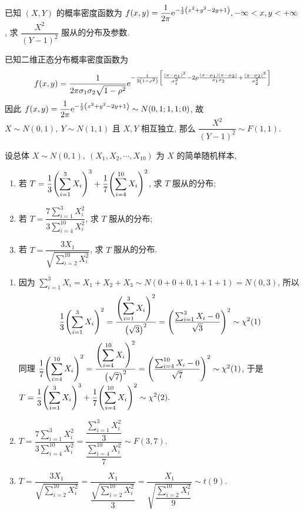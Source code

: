 \begin{example}
    已知 $(X,Y)$ 的概率密度函数为 $\displaystyle f(x,y)=\dfrac{1}{2\pi}\mathrm{e}^{-\frac{1}{2}\qty(x^2+y^2-2y+1)},-\infty<x,y<+\infty$, 求 $\dfrac{X^2}{(Y-1)^2}$ 服从的分布及参数.
\end{example}
\begin{solution}
    已知二维正态分布概率密度函数为 $$f(x,y)=\dfrac{1}{2\pi\sigma_1\sigma_2\sqrt{1-\rho^2}}\mathrm{e}^{-\frac{1}{2\qty(1-\rho^2)}\qty[\frac{(x-\mu_1)^2}{\sigma_1^2}-2\rho\frac{(x-\mu_1)(x-\mu_2)}{\sigma_1\sigma_2}+\frac{(y-\mu_2)^2}{\sigma_2^2}]}$$
    因此 $f(x,y)=\dfrac{1}{2\pi}\mathrm{e}^{-\frac{1}{2}\qty(x^2+y^2-2y+1)}\sim N(0,1;1,1;0)$, 故 $X\sim N(0,1),~Y\sim N(1,1)$ 且 $X,Y$ 相互独立, 那么 $\dfrac{X^2}{(Y-1)^2}\sim F(1,1).$
\end{solution}

\begin{example}
    设总体 $X\sim N(0,1),~(X_1,X_2,\cdots,X_{10})$ 为 $X$ 的简单随机样本, 
    \begin{enumerate}[label=(\arabic{*})]
        \item 若 $T=\displaystyle\dfrac{1}{3}\qty(\sum_{i=1}^{3}X_i)^3+\dfrac{1}{7}\qty(\sum_{i=4}^{10}X_i)^2$, 求 $T$ 服从的分布;
        \item 若 $T=\dfrac{\displaystyle7\sum_{i=1}^{3}X_i^2}{\displaystyle 3\sum_{i=4}^{10}X_i^2}$, 求 $T$ 服从的分布;
        \item 若 $T=\dfrac{3X_1}{\sqrt{\displaystyle\sum_{i=2}^{10}X_i^2}}$, 求 $T$ 服从的分布.
    \end{enumerate}
\end{example}
\begin{solution}
    \begin{enumerate}[label=(\arabic{*})]
        \item 因为 $\displaystyle\sum_{i=1}^{3}X_i=X_1+X_2+X_3\sim N(0+0+0,1+1+1)=N(0,3)$, 所以
              $$\dfrac{1}{3}\qty(\sum_{i=1}^{3}X_i)^2=\dfrac{\displaystyle\qty(\sum_{i=1}^{3}X_i)^2}{\qty(\sqrt{3})^2}=\qty(\dfrac{\sum_{i=1}^{3}X_i-0}{\sqrt{3}})^2\sim \chi^2(1)$$
              同理 $\dfrac{1}{7}\qty(\displaystyle\sum_{i=4}^{10}X_i)^2=\dfrac{\qty(\displaystyle\sum_{i=4}^{10}X_i)^2}{\qty(\sqrt{7})^2}=\qty(\dfrac{\sum_{i=4}^{10}X_i-0}{\sqrt{7}})^2\sim\chi^2(1)$, 
              于是 $T=\displaystyle\dfrac{1}{3}\qty(\sum_{i=1}^{3}X_i)^3+\dfrac{1}{7}\qty(\sum_{i=4}^{10}X_i)^2\sim\chi^2(2).$
        \item $T=\dfrac{\displaystyle7\sum_{i=1}^{3}X_i^2}{\displaystyle 3\sum_{i=4}^{10}X_i^2}=\dfrac{\dfrac{\sum_{i=1}^{3}X_i^2}{3}}{\dfrac{\sum_{i=4}^{10}X_i^2}{7}}\sim F(3,7).$
        \item $T=\dfrac{3X_1}{\sqrt{\displaystyle\sum_{i=2}^{10}X_i^2}}=\dfrac{X_1}{\dfrac{\sqrt{\sum_{i=2}^{10}X_i^2}}{3}}=\dfrac{X_1}{\sqrt{\dfrac{\sum_{i=2}^{10}X_i^2}{9}}}\sim t(9).$
    \end{enumerate}
\end{solution}
